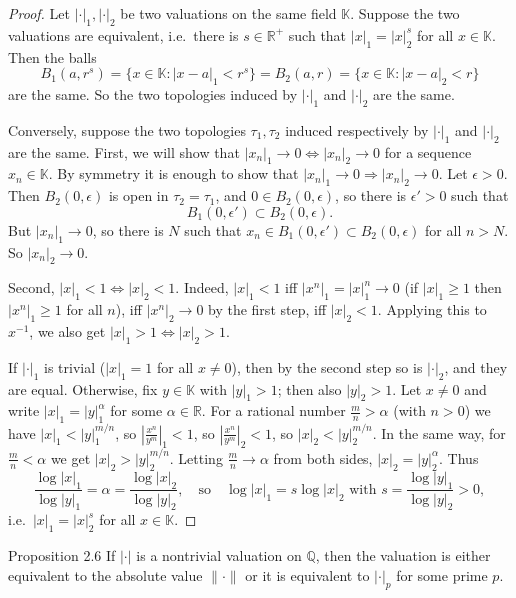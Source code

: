 \documentclass[11pt]{article}
\begin{document}
\begin{proof}
Let $|\cdot|_1, |\cdot|_2$ be two valuations on the same field $\mathbb{K}$. Suppose the two valuations are equivalent, i.e.\ there is $s \in \mathbb{R}^+$ such that $|x|_1 = |x|_2^s$ for all $x \in \mathbb{K}$. Then the balls
\[
B_1(a, r^s) = \{ x \in \mathbb{K} : |x - a|_1 < r^s \} = B_2(a, r) = \{ x \in \mathbb{K} : |x - a|_2 < r \}
\]
are the same. So the two topologies induced by $|\cdot|_1$ and $|\cdot|_2$ are the same.

Conversely, suppose the two topologies $\tau_1, \tau_2$ induced respectively by $|\cdot|_1$ and $|\cdot|_2$ are the same. First, we will show that $|x_n|_1 \rightarrow 0 \Longleftrightarrow |x_n|_2 \rightarrow 0$ for a sequence $x_n \in \mathbb{K}$. By symmetry it is enough to show that $|x_n|_1 \rightarrow 0 \Rightarrow |x_n|_2 \rightarrow 0$. Let $\epsilon > 0$. Then $B_2(0, \epsilon)$ is open in $\tau_2 = \tau_1$, and $0 \in B_2(0, \epsilon)$, so there is $\epsilon' > 0$ such that
\[
B_1(0, \epsilon') \subset B_2(0, \epsilon) .
\]
But $|x_n|_1 \rightarrow 0$, so there is $N$ such that $x_n \in B_1(0, \epsilon') \subset B_2(0, \epsilon)$ for all $n > N$. So $|x_n|_2 \rightarrow 0$.

Second, $|x|_1 < 1 \Longleftrightarrow |x|_2 < 1$. Indeed, $|x|_1 < 1$ iff $|x^n|_1 = |x|_1^n \rightarrow 0$ (if $|x|_1 \geq 1$ then $|x^n|_1 \geq 1$ for all $n$), iff $|x^n|_2 \rightarrow 0$ by the first step, iff $|x|_2 < 1$. Applying this to $x^{-1}$, we also get $|x|_1 > 1 \Longleftrightarrow |x|_2 > 1$.

If $|\cdot|_1$ is trivial ($|x|_1 = 1$ for all $x \neq 0$), then by the second step so is $|\cdot|_2$, and they are equal. Otherwise, fix $y \in \mathbb{K}$ with $|y|_1 > 1$; then also $|y|_2 > 1$. Let $x \neq 0$ and write $|x|_1 = |y|_1^{\alpha}$ for some $\alpha \in \mathbb{R}$. For a rational number $\frac{m}{n} > \alpha$ (with $n > 0$) we have $|x|_1 < |y|_1^{m/n}$, so $\left|\frac{x^n}{y^m}\right|_1 < 1$, so $\left|\frac{x^n}{y^m}\right|_2 < 1$, so $|x|_2 < |y|_2^{m/n}$. In the same way, for $\frac{m}{n} < \alpha$ we get $|x|_2 > |y|_2^{m/n}$. Letting $\frac{m}{n} \rightarrow \alpha$ from both sides, $|x|_2 = |y|_2^{\alpha}$. Thus
\[
\frac{\log |x|_1}{\log |y|_1} = \alpha = \frac{\log |x|_2}{\log |y|_2},
\quad\text{so}\quad
\log |x|_1 = s \log |x|_2 \text{ with } s = \frac{\log |y|_1}{\log |y|_2} > 0,
\]
i.e.\ $|x|_1 = |x|_2^s$ for all $x \in \mathbb{K}$.
\end{proof}

\begin{thmbox}{Proposition 2.6}
If $|\cdot|$ is a nontrivial valuation on $\mathbb{Q}$, then the valuation is either equivalent to the absolute value $\|\cdot\|$ or it is equivalent to $|\cdot|_p$ for some prime $p$.
\end{thmbox}
\end{document}
